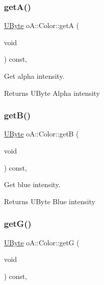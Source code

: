 \subsubsection{\texorpdfstring{get\+A()}{getA()}}
{\footnotesize\ttfamily \mbox{\hyperlink{namespaceo_a_a8c38e43a304d568b8495770dd8d50513}{U\+Byte}} o\+A\+::\+Color\+::getA (\begin{DoxyParamCaption}\item[{void}]{ }\end{DoxyParamCaption}) const\hspace{0.3cm}{\ttfamily [inline]}, {\ttfamily [noexcept]}}



Get alpha intensity. 

\begin{DoxyReturn}{Returns}
U\+Byte Alpha intensity 
\end{DoxyReturn}
\mbox{\label{classo_a_1_1_color_a8a30e79da1de484a4ff47ed2bcbc8e23}} 
\subsubsection{\texorpdfstring{get\+B()}{getB()}}
{\footnotesize\ttfamily \mbox{\hyperlink{namespaceo_a_a8c38e43a304d568b8495770dd8d50513}{U\+Byte}} o\+A\+::\+Color\+::getB (\begin{DoxyParamCaption}\item[{void}]{ }\end{DoxyParamCaption}) const\hspace{0.3cm}{\ttfamily [inline]}, {\ttfamily [noexcept]}}



Get blue intensity. 

\begin{DoxyReturn}{Returns}
U\+Byte Blue intensity 
\end{DoxyReturn}
\mbox{\label{classo_a_1_1_color_a3dcd5785db4a2c1a5a49a70d5378154a}} 
\subsubsection{\texorpdfstring{get\+G()}{getG()}}
{\footnotesize\ttfamily \mbox{\hyperlink{namespaceo_a_a8c38e43a304d568b8495770dd8d50513}{U\+Byte}} o\+A\+::\+Color\+::getG (\begin{DoxyParamCaption}\item[{void}]{ }\end{DoxyParamCaption}) const\hspace{0.3cm}{\ttfamily [inline]}, {\ttfamily [noexcept]}}



